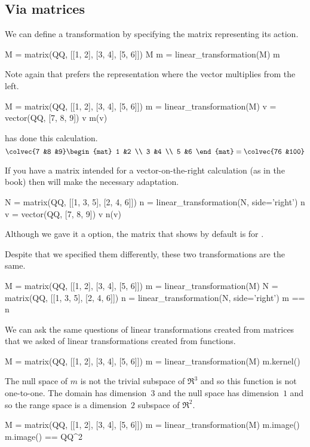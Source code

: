 \subsection{Via matrices}
We can define a transformation by specifying 
the matrix representing its action.
\begin{sageoutput}
M = matrix(QQ, [[1, 2], [3, 4], [5, 6]])
M
m = linear_transformation(M)
m  
\end{sageoutput}
\noindent Note again that \Sage{} prefers the 
representation where the vector multiplies
from the left.
\begin{sageoutput}[d,0,2]
M = matrix(QQ, [[1, 2], [3, 4], [5, 6]])
m = linear_transformation(M)
v = vector(QQ, [7, 8, 9])
v
m(v)  
\end{sageoutput}
\noindent \Sage{} has done this calculation.
\begin{equation*}
  \colvec{7 &8 &9}
  \begin{mat}
    1 &2 \\
    3 &4 \\
    5 &6
  \end{mat}
  =\colvec{76 &100}
\end{equation*}

If you have a matrix intended for a vector-on-the-right
calculation (as in the book) then \Sage{} will make the necessary adaptation.
\begin{sageoutput}
N = matrix(QQ, [[1, 3, 5], [2, 4, 6]])
n = linear_transformation(N, side='right')
n
v = vector(QQ, [7, 8, 9])
v
n(v)  
\end{sageoutput}
\noindent Although we gave it a  option, 
the matrix that \Sage{} shows by default is for 
.

Despite that we specified them differently, 
these two transformations are the same.
\begin{sageoutput}
M = matrix(QQ, [[1, 2], [3, 4], [5, 6]])
m = linear_transformation(M)
N = matrix(QQ, [[1, 3, 5], [2, 4, 6]])
n = linear_transformation(N, side='right')
m == n  
\end{sageoutput}

We can ask the same questions of linear transformations created from
matrices that we asked of linear transformations created from functions.
\begin{sageoutput}
M = matrix(QQ, [[1, 2], [3, 4], [5, 6]])
m = linear_transformation(M)
m.kernel() 
\end{sageoutput}
\noindent The null space of $m$ is not the trivial subspace of $\Re^3$ 
and so this function is not one-to-one.
The domain has dimension~$3$ and the null space has dimension~$1$ 
and so the
range space is a dimension~$2$ subspace of $\Re^2$.
\begin{sageoutput}[d,0,2] 
M = matrix(QQ, [[1, 2], [3, 4], [5, 6]])
m = linear_transformation(M)
m.image()
m.image() == QQ^2
\end{sageoutput}

